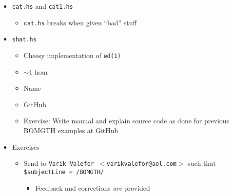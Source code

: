 \documentclass{article}
\begin{document}
	\begin{itemize}
		\item \texttt{cat.hs} and \texttt{cat1.hs}
		\begin{itemize}
			\item \texttt{cat.hs} breaks when given ``bad'' stuff
		\end{itemize}
		\item \texttt{shat.hs}
		\begin{itemize}
			\item Cheesy implementation of \texttt{ed(1)}
			\item $\sim$1 hour
			\item Name
			\item GitHub
			\item Exercise: Write manual and explain source code as
				done for previous BOMGTH examples at GitHub
		\end{itemize}
		\item Exercises
		\begin{itemize}
			\item Send to \texttt{Varik Valefor $<$varikvalefor@aol.com$>$}
				such that\\
				\texttt{\$subjectLine~=\raisebox{0.5ex}{\texttildelow}~/BOMGTH/}
			\begin{itemize}
				\item Feedback and corrections \textit{are} provided
			\end{itemize}
		\end{itemize}
	\end{itemize}
\end{document}
